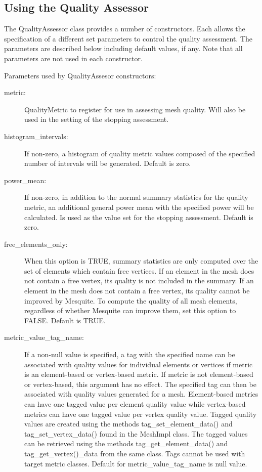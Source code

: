 \subsection{Using the Quality Assessor}

  The QualityAssessor class provides a number of constructors.	Each allows the specification of a different set parameters to control the quality assessment.	The parameters are described below including default values, if any. Note that all parameters are not used in each constructor.

\label{QA_params}
Parameters used by QualityAssesor constructors:
\begin{description}
\item[metric:]	 QualityMetric to register for use in assessing mesh quality.  Will also be used in the setting of the stopping assessment.

\item[histogram\_intervals:]   If non-zero, a histogram of quality metric values composed of the specified number of intervals will be generated.  Default is zero.
\item[power\_mean:] If non-zero, in addition to the normal summary statistics for the quality metric, an additional general power mean with the specified power will be calculated.  Is used as the value set for the stopping assessment.  Default is zero.

\item[free\_elements\_only:] When this option is TRUE, summary statistics are only computed over the set of elements which contain free vertices. If an element in the mesh does not contain a free vertex, its quality is not included in the summary.	 If an element in the mesh does not contain a free vertex, its quality cannot be improved by Mesquite.	To compute the quality of all mesh elements, regardless of whether Mesquite can improve them, set this option to FALSE.	 Default is TRUE.

\item[metric\_value\_tag\_name:] If a non-null value is specified, a tag with the specified name can be associated with quality values for individual elements or vertices if metric is an element-based or vertex-based metric.  If metric is not element-based or vertex-based, this argument has no effect. The specified tag can then be associated with quality values generated for a mesh.  Element-based metrics can have one tagged value per element quality value while vertex-based metrics can have one tagged value per vertex quality value.  Tagged quality values are created using the methods tag\_set\_element\_data() and tag\_set\_vertex\_data() found in the MeshImpl class. The tagged values can be retrieved using the methods tag\_get\_element\_data() and tag\_get\_vertex()\_data from the same class.  Tags cannot be used with target metric classes. Default for metric\_value\_tag\_name is null value.


\end{description}
